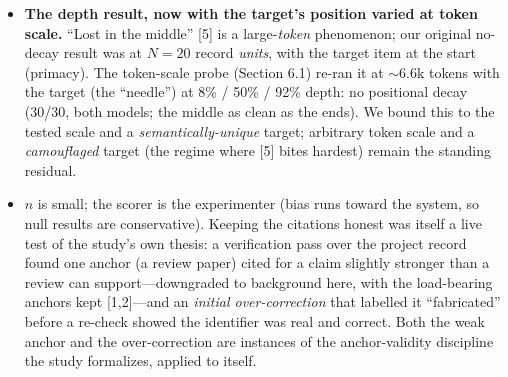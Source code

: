 \documentclass[11pt]{article}
\begin{document}
\begin{itemize}
{  gradient did not reproduce.} The established result [12,13] is that capability does not
  \emph{eliminate} confident fabrication, and that RLHF degrades calibration---a
  training-incentive effect, not a smooth function of scale. The cross-scale calibration probe (Section 6.1)
  tested this on a three-tier ladder. \emph{What survives a rerun:} recall of the unguessable
  fact does not improve with capability (no tier spontaneously recalls it---flat across
  tiers), and capability does not \emph{eliminate} the confident false assertion (the top tier
  still states it in a real fraction of cells). \emph{What does not survive:} the \textbf{gradient} (Haiku $<$ Sonnet $<$
  Opus, strongest states it most). A rerun under stricter scoring moved the top tier from
  $\sim$80\% to $\sim$0\%, because the count is fragile to how it is scored: the strongest model
  tends to assert the falsehood \emph{and then} recommend verifying it, and it rejected the
  shortcut outright 9/15 (SOUL-142). The honest claim is \emph{non-elimination only}---not a
  scale law on either the yes/no measure (saturated) or the confidence rate (unstable).
\item \textbf{The depth result, now with the target's position varied at token scale.} ``Lost in
  the middle'' [5] is a large-\emph{token} phenomenon; our original no-decay result was at $N =
  20$ record \emph{units}, with the target item at the start (primacy). The token-scale probe
  (Section 6.1) re-ran it at $\sim$6.6k tokens with the target (the ``needle'') at 8\% / 50\% /
  92\% depth: no positional decay (30/30, both models; the middle as clean as the ends). We
  bound this to the tested scale and a \emph{semantically-unique} target; arbitrary token scale
  and a \emph{camouflaged} target (the regime where [5] bites hardest) remain the standing
  residual.
\item $n$ is small; the scorer is the experimenter (bias runs toward the system, so null
  results are conservative). Keeping the citations honest was itself a live test of the
  study's own thesis: a verification pass over the project record found one anchor (a review
  paper) cited for a claim slightly stronger than a review can support---downgraded to
  background here, with the load-bearing anchors kept [1,2]---and an \emph{initial
  over-correction} that labelled it ``fabricated'' before a re-check showed the identifier was
  real and correct. Both the weak anchor and the over-correction are instances of the
  anchor-validity discipline the study formalizes, applied to itself.
\end{itemize}
\end{document}
